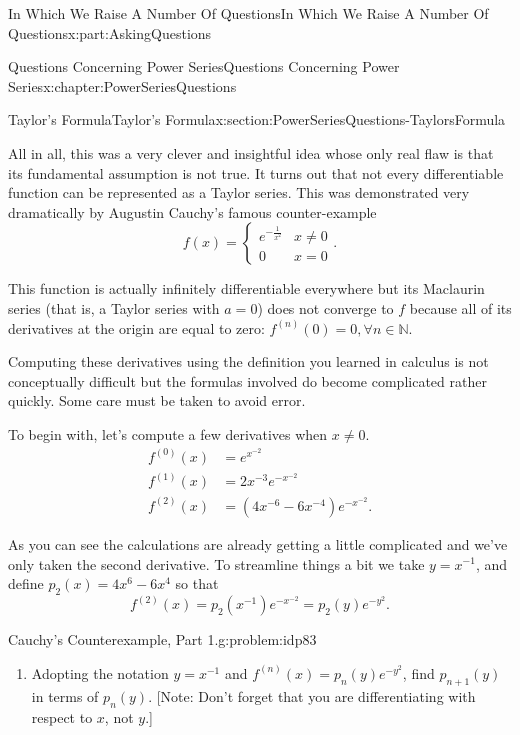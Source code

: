 \documentclass[oneside,10pt,]{book}
\numberwithin{equation}{section}
\newcommand{\NN}{\mathbb {N}}
\newcommand{\amp}{&}
\begin{document}
\begin{partptx}{In Which We Raise A Number Of Questions}{}{In Which We Raise A Number Of Questions}{}{}{x:part:AskingQuestions}
\begin{chapterptx}{Questions Concerning Power Series}{}{Questions Concerning Power Series}{}{}{x:chapter:PowerSeriesQuestions}
\begin{sectionptx}{Taylor's Formula}{}{Taylor's Formula}{}{}{x:section:PowerSeriesQuestions-TaylorsFormula}
\par
All in all, this was a very clever and insightful idea whose only real flaw is that its fundamental assumption is not true. It turns out that not every differentiable function can be represented as a Taylor series. This was demonstrated very dramatically by Augustin Cauchy's  famous counter-example%
\begin{equation}
f(x) = \begin{cases} e^{-\frac{1}{x^2}}\amp  x\ne0\\ 0 \amp x=0 \end{cases}\text{.}\label{x:men:eq_CauchyCounterEx}
\end{equation}
%
\par
This function is actually infinitely differentiable everywhere but its Maclaurin series (that is, a Taylor series with \(a=0\)) does not converge to \(f\) because all of its derivatives at the origin are equal to zero: \(f^{(n)}(0) = 0, \forall n\in\NN\).%
\par
Computing these derivatives using the definition you learned in calculus is not conceptually difficult but the formulas involved do become complicated rather quickly. Some care must be taken to avoid error.%
\par
To begin with, let's compute a few derivatives when \(x \neq 0\).%
\begin{align*}
f^{(0)}(x) \amp = e^{x^{-2}}\\
f^{(1)}(x) \amp = 2x^{-3}e^{-x^{-2}}\\
f^{(2)}(x) \amp = \left(4x^{-6}-6x^{-4}\right)e^{-x^{-2}}\text{.}
\end{align*}
%
\par
As you can see the calculations are already getting a little complicated and we've only taken the second derivative. To streamline things a bit we take \(y= x^{-1}\), and define \(p_2(x) = 4x^6-6x^4\) so that%
\begin{equation*}
f^{(2)}(x) = p_2(x^{-1})e^{-x^{-2}} = p_2(y)e^{-y^2}\text{.}
\end{equation*}
%
\begin{problem}{Cauchy's Counterexample, Part 1.}{g:problem:idp83}%
\begin{enumerate}[font=\bfseries,label=(\alph*),ref=\alph*]
\item{}Adopting the notation \(y=x^{-1}\) and \(f^{(n)}(x) =p_n(y)e^{-y^2}\), find \(p_{n+1}(y)\) in terms of \(p_{n}(y)\). [Note: Don't forget that you are differentiating with respect to \(x\), not \(y\).]%

\end{enumerate}
\end{problem}
\end{sectionptx}
\end{chapterptx}
\end{partptx}
\end{document}
